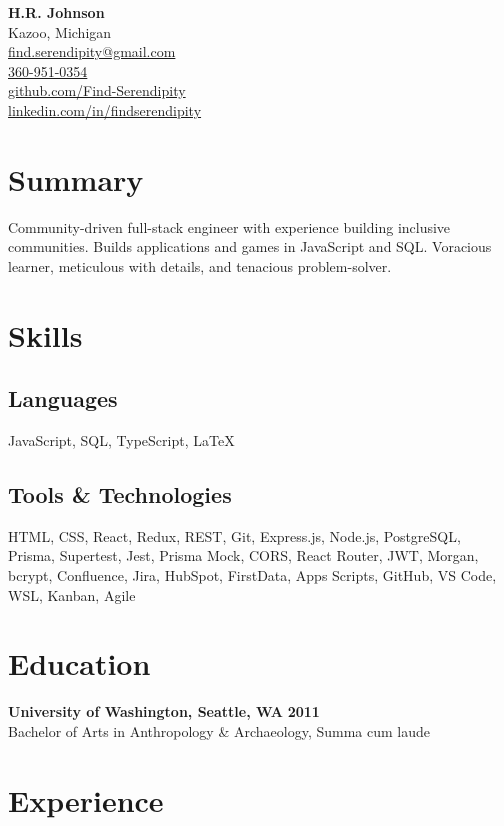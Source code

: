 \documentclass[a4paper,9pt]{article}
\begin{document}
\begin{center}
    {\Large \textbf{H.R. Johnson}} \\
    \vspace{0.1em}
    Kazoo, Michigan \\
    \href{mailto:find.serendipity@gmail.com}{find.serendipity@gmail.com} \\
    \href{tel:360-951-0354}{360-951-0354} \\
    \href{https://github.com/Find-Serendipity}{github.com/Find-Serendipity} \\

    \href{https://www.linkedin.com/in/findserendipity/}{linkedin.com/in/findserendipity}
\end{center}

\section{Summary}
\noindent
Community-driven full-stack engineer with experience building inclusive
communities. Builds applications and games in JavaScript and SQL. Voracious
learner, meticulous with details, and tenacious problem-solver.

\section{Skills}
\subsection{Languages}
JavaScript, SQL, TypeScript, LaTeX

\subsection{Tools \& Technologies}
HTML, CSS, React, Redux, REST, Git, Express.js, Node.js, PostgreSQL, Prisma,
Supertest, Jest, Prisma Mock, CORS, React Router, JWT, Morgan, bcrypt,
Confluence, Jira, HubSpot, FirstData, Apps Scripts, GitHub, VS Code, WSL,
Kanban, Agile

\section{Education}
\textbf{University of Washington, Seattle, WA} \hfill \textbf{2011} \\
Bachelor of Arts in Anthropology \& Archaeology, Summa cum laude

\section{Experience}
\end{document}
